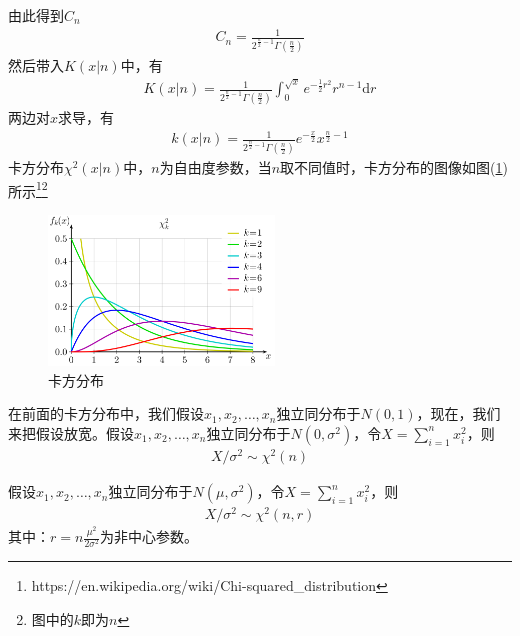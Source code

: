        由此得到$C_n$
        \begin{align*}
        C_n = \frac{1}{2^{\frac{n}{2}-1}\Gamma \left( \frac{n}{2} \right)}
        \end{align*}
        然后带入$K(x|n)$中，有
        \begin{align*}
        K(x|n) = \frac{1}{2^{\frac{n}{2}-1}\Gamma \left( \frac{n}{2} \right)} \int_0^{\sqrt{x}}e^{-\frac 12 r^2}r^{n-1}\mathrm{d}r
        \end{align*}
        两边对$x$求导，有
        \begin{align*}
        k(x|n) = \frac{1}{2^{\frac{n}{2}-1}\Gamma \left( \frac{n}{2} \right)}e^{-\frac{x}{2}}x^{\frac{n}{2}-1}
        \end{align*}
        卡方分布$\chi^2(x|n)$中，$n$为自由度参数，当$n$取不同值时，卡方分布的图像如图(\ref{fig:卡方分布图})所示\footnote{https://en.wikipedia.org/wiki/Chi-squared\_distribution}\footnote{图中的$k$即为$n$}
           \begin{figure}[H]
           \centering
           \includegraphics[width=6cm]{images/Chisquare_distribution.png}
           \caption{卡方分布}
           \label{fig:卡方分布图}
           \end{figure}
        \begin{corollary}[卡方分布的一般形式1]
        在前面的卡方分布中，我们假设$x_1,x_2,\dots,x_n$独立同分布于$N(0,1)$，现在，我们来把假设放宽。假设$x_1,x_2,\dots,x_n$独立同分布于$N(0,\sigma^2)$，令$X = \sum_{i= 1}^nx_i^2$，则
        \begin{align*}
        X/\sigma^2 \sim \chi^2(n)
        \end{align*}
        \end{corollary}
        \begin{corollary}[卡方分布的一般形式2]
        假设$x_1,x_2,\dots,x_n$独立同分布于$N(\mu,\sigma^2)$，令$X = \sum_{i= 1}^nx_i^2$，则
        \begin{align*}
        X/\sigma^2 \sim \chi^2(n,r)
        \end{align*}
        其中：$r = n\frac{\mu^2}{2\sigma^2}$为非中心参数。
        \end{corollary}
